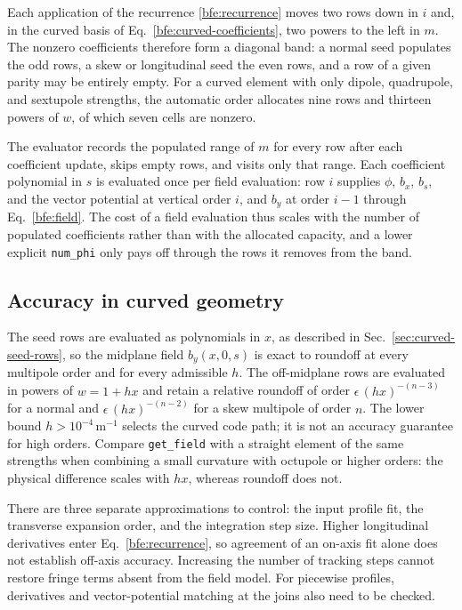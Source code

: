 Each application of the recurrence \eqref{bfe:recurrence} moves two rows
down in \(i\) and, in the curved basis of
Eq.~\eqref{bfe:curved-coefficients}, two powers to the left in \(m\). The
nonzero coefficients therefore form a diagonal band: a normal seed
populates the odd rows, a skew or longitudinal seed the even rows, and a
row of a given parity may be entirely empty. For a curved element with
only dipole, quadrupole, and sextupole strengths, the automatic order
allocates nine rows and thirteen powers of \(w\), of which seven cells are
nonzero.

The evaluator records the populated range of \(m\) for every row after
each coefficient update, skips empty rows, and visits only that range.
Each coefficient polynomial in \(s\) is evaluated once per field
evaluation: row \(i\) supplies \(\phi\), \(b_x\), \(b_s\), and the vector
potential at vertical order \(i\), and \(b_y\) at order \(i-1\) through
Eq.~\eqref{bfe:field}. The cost of a field evaluation thus scales with the
number of populated coefficients rather than with the allocated capacity,
and a lower explicit \texttt{num\_phi} only pays off through the rows it
removes from the band.

\subsection{Accuracy in curved geometry}

The seed rows are evaluated as polynomials in \(x\), as described in
Sec.~\ref{sec:curved-seed-rows}, so the midplane field \(b_y(x,0,s)\) is
exact to roundoff at every multipole order and for every admissible
\(h\). The off-midplane rows are evaluated in powers of \(w=1+hx\) and
retain a relative roundoff of order \(\epsilon\,(hx)^{-(n-3)}\) for a
normal and \(\epsilon\,(hx)^{-(n-2)}\) for a skew multipole of order
\(n\). The lower bound \(h>10^{-4}\,\mathrm{m}^{-1}\) selects the curved
code path; it is not an accuracy guarantee for high orders. Compare
\texttt{get\_field} with a straight element of the same strengths when
combining a small curvature with octupole or higher orders: the physical
difference scales with \(hx\), whereas roundoff does not.

There are three separate approximations to control: the input profile fit,
the transverse expansion order, and the integration step size. Higher
longitudinal derivatives enter Eq.~\eqref{bfe:recurrence}, so agreement of
an on-axis fit alone does not establish off-axis accuracy. Increasing the
number of tracking steps cannot restore fringe terms absent from the field
model. For piecewise profiles, derivatives and vector-potential matching at
the joins also need to be checked.

